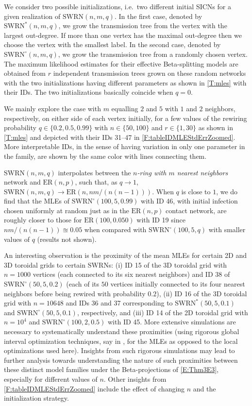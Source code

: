 \documentclass[review]{elsarticle}
\numberwithin{equation}{section}
\let\orgautoref\autoref
\renewcommand{\autoref}
        {\def\equationautorefname{Eq.}%
         \def\figureautorefname{Fig.}%
         \def\subfigureautorefname{Fig.}%
         \def\sectionautorefname{Sect.}%
         \def\subsectionautorefname{Sect.}%
         \def\subsubsectionautorefname{Sect.}%
         \def\Itemautorefname{item}%
         \def\tableautorefname{Table}%
         \def\propositionautorefname{Prop.}%
         \def\corollaryautorefname{Corollary}%
         \def\theoremautorefname{Theorem}%
         \def\remarkautorefname{Remark}%
         \def\lemmaautorefname{Lemma}%
         \def\proofofautorefname{Proof}%
         \def\exampleautorefname{Example}%
         \orgautoref}
\begin{document}
We consider two possible initializations, i.e.~two different initial SICNs for a given realization of $\mathrm{SWRN}(n,m,q)$.  
In the first case, denoted by $\mathrm{SWRN}^*(n,m,q)$, we grow the transmission tree from the vertex with the largest out-degree.  
If more than one vertex has the maximal out-degree then we choose the vertex with the smallest label.  
In the second case, denoted by $\mathrm{SWRN}^{\circ}(n,m,q)$, we grow the transmission tree from a randomly chosen vertex.  
The maximum likelihood estimates for their effective Beta-splitting models are obtained from $r$ independent transmission trees grown on these random networks with the two initializations having different parameters as shown in \autoref{T:mles} with their IDs.  
The two initializations basically coincide when $q=0$.  

We mainly explore the case with $m$ equalling $2$ and $5$ with $1$ and $2$ neighbors, respectively, on either side of each vertex initially, for a few values of the rewiring probability $q \in \{0.2,0.5,0.99\}$ with $n\in\{50,100\}$ and $r \in \{1,30\}$ as shown in \autoref{T:mles} and depicted with their IDs 31--47 in \autoref{F:tableIDMLEStdErrZoomed}.  
More interpretable IDs, in the sense of having variation in only one parameter in the family, are shown by the same color with lines connecting them.  

$\mathrm{SWRN}(n,m,q)$ interpolates between the {\em $n$-ring with $m$ nearest neighbors} network and $\mathrm{ER}(n,p)$, 
such that, as $q \to 1$, $\mathrm{SWRN}(n,m,q) \to \mathrm{ER}\left(n, nm/(n(n-1))\right)$.
When $q$ is close to $1$, we do find that the MLEs of $\mathrm{SWRN}^{\circ}(100,5,0.99)$ with ID 46, with initial infection chosen uniformly at random just as in the $\mathrm{ER}(n,p)$ contact network, are roughly closer to those for 
$\mathrm{ER}(100,0.050)$ with ID 19 since $nm/(n(n-1)) \approxeq 0.05$ when compared with $\mathrm{SWRN}^{\circ}(100,5,q)$ with smaller values of $q$ (results not shown).  

An interesting observation is the proximity of the mean MLEs for certain 2D and 3D toroidal grids to certain $\mathrm{SWRN}$s: (i) ID 15 of the 3D toroidal grid with $n=1000$ vertices (each connected to its six nearest neighbors) and ID 38 of $\mathrm{SWRN}^{\circ}(50,5,0.2)$ (each of its $50$ vertices initially connected to its four nearest neighbors before being rewired with probability $0.2$), (ii) ID 16 of the 3D toroidal grid with $n=10648$ and IDs 36 and 37 corresponding to $\mathrm{SWRN}^{*}(50,5,0.1)$ and $\mathrm{SWRN}^{\circ}(50,5,0.1)$, respectively, and (iii) ID 14 of the 2D toroidal grid with $n=10^4$ and $\mathrm{SWRN}^{\circ}(100,2,0.5)$ with ID 45.  
More extensive simulations are necessary to systematically understand these proximities (using rigorous global interval optimization techniques, say in \cite{HofschusterK03}, for the MLEs as opposed to the local optimizations used here).  
Insights from such rigorous simulations may lead to further analysis towards understanding the nature of such proximities between these distinct model families under the Beta-projections of \autoref{E:Thm3E3}, especially for different values of $n$.  
Other insights from \autoref{F:tableIDMLEStdErrZoomed} include the effect of changing $n$ and the initialization strategy.
\end{document}
